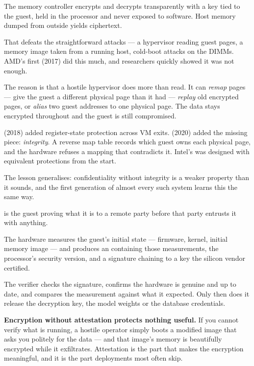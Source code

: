 \begin{conceptbox}
The memory controller encrypts and decrypts transparently with a key tied to
the guest, held in the processor and never exposed to software. Host memory
dumped from outside yields ciphertext.

\smallskip
That defeats the straightforward attacks --- a hypervisor reading guest pages,
a memory image taken from a running host, cold-boot attacks on the DIMMs. AMD's
first  (2017) did this much, and researchers quickly showed it was
not enough.

\smallskip
The reason is that a hostile hypervisor does more than read. It can
\emph{remap} pages --- give the guest a different physical page than it had ---
\emph{replay} old encrypted pages, or \emph{alias} two guest addresses to one
physical page. The data stays encrypted throughout and the guest is still
compromised.

\smallskip
{} (2018) added register-state protection across VM exits.
 (2020) added the missing piece: \emph{integrity}. A reverse map
table records which guest owns each physical page, and the hardware refuses a
mapping that contradicts it. Intel's  was designed with equivalent
protections from the start.

\smallskip
The lesson generalises: confidentiality without integrity is a weaker property
than it sounds, and the first generation of almost every such system learns
this the same way.
\end{conceptbox}

\begin{definitionbox}[Attestation]
 is the guest proving what it is to a remote party before that
party entrusts it with anything.

\smallskip
The hardware measures the guest's initial state --- firmware, kernel, initial
memory image --- and produces an  containing those
measurements, the processor's security version, and a signature chaining to a
key the silicon vendor certified.

\smallskip
The verifier checks the signature, confirms the hardware is genuine and
up to date, and compares the measurement against what it expected. Only then
does it release the decryption key, the model weights or the database
credentials.

\smallskip
\textbf{Encryption without attestation protects nothing useful.} If you cannot
verify what is running, a hostile operator simply boots a modified image that
asks you politely for the data --- and that image's memory is beautifully
encrypted while it exfiltrates. Attestation is the part that makes the
encryption meaningful, and it is the part deployments most often skip.
\end{definitionbox}

